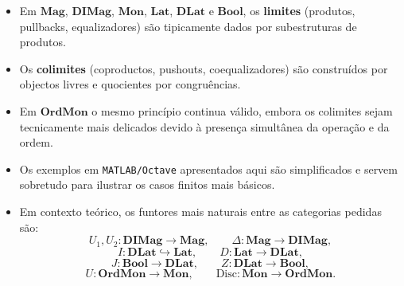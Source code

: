 \documentclass[a4paper,12pt]{article}
\begin{document}
\begin{itemize}
    \item Em $\mathbf{Mag}$, $\mathbf{DIMag}$, $\mathbf{Mon}$, $\mathbf{Lat}$,
    $\mathbf{DLat}$ e $\mathbf{Bool}$, os \textbf{limites} (produtos, pullbacks,
    equalizadores) são tipicamente dados por subestruturas de produtos.

    \item Os \textbf{colimites} (coproductos, pushouts, coequalizadores) são
    construídos por objectos livres e quocientes por congruências.

    \item Em $\mathbf{OrdMon}$ o mesmo princípio continua válido, embora os
    colimites sejam tecnicamente mais delicados devido à presença simultânea da
    operação e da ordem.

    \item Os exemplos em \texttt{MATLAB/Octave} apresentados aqui são
    simplificados e servem sobretudo para ilustrar os casos finitos mais básicos.

    \item Em contexto teórico, os funtores mais naturais entre as categorias
    pedidas são:
    \[
    U_1,U_2:\mathbf{DIMag}\to \mathbf{Mag},
    \qquad
    \Delta:\mathbf{Mag}\to \mathbf{DIMag},
    \]
    \[
    I:\mathbf{DLat}\hookrightarrow \mathbf{Lat},
    \qquad
    D:\mathbf{Lat}\to \mathbf{DLat},
    \]
    \[
    J:\mathbf{Bool}\to \mathbf{DLat},
    \qquad
    Z:\mathbf{DLat}\to \mathbf{Bool},
    \]
    \[
    U:\mathbf{OrdMon}\to \mathbf{Mon},
    \qquad
    \mathrm{Disc}:\mathbf{Mon}\to \mathbf{OrdMon}.
    \]
\end{itemize}
\end{document}
